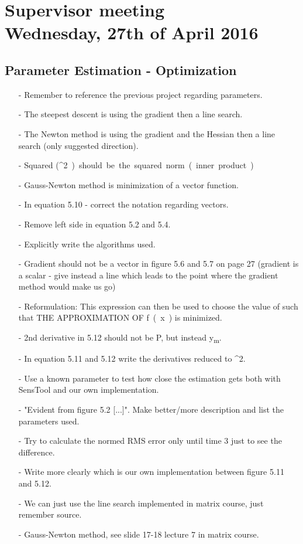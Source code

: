 
\renewcommand{\vec}[1]{\boldsymbol{\mathbf{#1}}}

\renewcommand\chaptername{KAPITEL}
\renewcommand\contentsname{Indhold}
\renewcommand\figurename{Figur}
\renewcommand\tablename{Tabel}

\section*{Supervisor meeting\\ \small Wednesday, 27th of April 2016}

\subsection{Parameter Estimation - Optimization}
\begin{itemize}
  \item[-] Remember to reference the previous project regarding parameters.
  \item[-] The steepest descent is using the gradient then a line search.
  \item[-] The Newton method is using the gradient and the Hessian then a line search (only suggested direction).
  \item[-] Squared (\si{^2}) should be the squared norm (inner product)
  \item[-] Gauss-Newton method is minimization of a vector function.
  \item[-] In equation 5.10 - correct the notation regarding vectors.
  \item[-] Remove left side in equation 5.2 and 5.4.
  \item[-] Explicitly write the algorithms used.
  \item[-] Gradient should not be a vector in figure 5.6 and 5.7 on page 27 (gradient is a scalar - give instead a line which leads to the point where the gradient method would make us go)
  \item[-] Reformulation: This expression can then be used to choose the value of \si{\vec{\delta}} such that THE APPROXIMATION OF \si{f(x)} is minimized.
  \item[-] 2nd derivative in 5.12 should not be P, but instead \si{y_m}.
  \item[-] In equation 5.11 and 5.12 write the derivatives reduced to \si{\partial\vec{\theta} ^2}.
  \item[-] Use a known parameter to test how close the estimation gets both with SensTool and our own implementation.
  \item[-] "Evident from figure 5.2 [...]". Make better/more description and list the parameters used.
  \item[-] Try to calculate the normed RMS error only until time 3 just to see the difference.
  \item[-] Write more clearly which is our own implementation between figure 5.11 and 5.12.
  \item[-] We can just use the line search implemented in matrix course, just remember source.
  \item[-] Gauss-Newton method, see slide 17-18 lecture 7 in matrix course.
\end{itemize}

